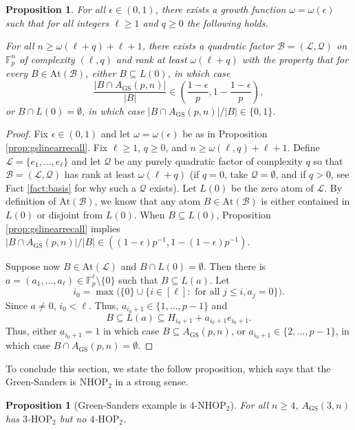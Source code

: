 \documentclass[12pt,oneside,british,a4wide]{amsart}
\newtheorem{proposition}[theorem]{Proposition}
\numberwithin{equation}{section}
\theoremstyle{definition}
\def\F{\mathbb{F}}
\def\HOP{\mathrm{HOP}}
\def\NHOP{\mathrm{NHOP}}
\def\GS{\mathrm{GS}}
\def\e{\epsilon}
\newcommand{\calL}{\mathcal{L}}
\newcommand{\calB}{\mathcal{B}}
\newcommand{\calQ}{\mathcal{Q}}
\newcommand{\At}{{\mathrm{At}}}
\begin{document}
\begin{proposition}\label{prop:gslinear1res}
For all $\e\in (0,1)$, there exists a growth function $\omega=\omega(\e)$ such that for all integers $\ell\geq 1$ and $q\geq 0$ the following holds. 

For all $n\geq \omega(\ell+q)+\ell+1$, there exists a quadratic factor $\calB=(\calL, \calQ)$ on $\mathbb{F}_p^n$ of complexity $(\ell,q)$ and rank at least $\omega(\ell+q)$ with the property that for every $B\in \At(\calB)$, either $B\subseteq L(0)$, in which case 
\[\frac{|B\cap A_{\GS}(p,n)|}{|B|}\in \left(\frac{1-\e}{p},1-\frac{1-\e}{p}\right),\] 
or $B\cap L(0)=\emptyset$, in which case $|B\cap A_{\GS}(p,n)|/|B|\in \{0,1\}$.  
\end{proposition}
\begin{proof}
Fix $\e\in (0,1)$ and let $\omega=\omega(\e)$ be as in Proposition \ref{prop:gslinearrecall}.  Fix $\ell\geq 1$, $q\geq 0$,  and $n\geq \omega(\ell,q)+\ell+1$.  Define $\calL=\{e_1,\ldots, e_{\ell}\}$ and let $\calQ$ be any purely quadratic factor of complexity $q$ so that $\calB=(\calL,\calQ)$ has rank at least $\omega(\ell+q)$ (if $q=0$, take $\calQ=\emptyset$, and if $q>0$, see Fact \ref{fact:basis} for why such a $\calQ$ exists).  Let $L(0)$ be the zero atom of $\calL$.  By definition of $\At(\calB)$, we know that any atom $B\in \At(\calB)$ is either contained in $L(0)$ or disjoint from $L(0)$.  When $B\subseteq L(0)$,  Proposition \ref{prop:gslinearrecall} implies $|B\cap A_{\GS}(p,n)|/|B|\in ((1-\e)p^{-1},1-(1-\e)p^{-1})$. 

Suppose now $B\in \At(\calL)$ and $B\cap L(0)=\emptyset$.  Then there is $a=(a_1,\ldots, a_{\ell})\in \F_p^{\ell}\setminus \{0\}$ such that $B\subseteq L(a)$.  Let 
$$
i_0=\max\Big( \{0\}\cup \{i\in [\ell]: \text{ for all }j\leq i, a_j=0\}\Big).
$$
Since $a\neq 0$, $i_0<\ell$.  Thus, $a_{i_0+1}\in  \{1,\ldots, p-1\}$ and
$$
B\subseteq L(a)\subseteq H_{i_0+1}+a_{i_0+1}e_{i_0+1}.
$$
Thus, either $a_{i_0+1}=1$ in which case  $B\subseteq A_{\GS}(p,n)$, or $a_{i_0+1}\in \{2,\ldots,p-1\}$, in which case $B\cap A_{\GS}(p,n)=\emptyset$.
\end{proof}

To conclude this section, we state the follow proposition, which says that the Green-Sanders  is $\NHOP_2$ in a strong sense.  

\begin{proposition}[Green-Sanders example is $4$-$\NHOP_2$]\label{prop:GSnoHOP}
For all $n\geq 4$, $A_{\GS}(3,n)$ has $3$-$\HOP_2$ but no $4$-$\HOP_2$.
\end{proposition}
\end{document}
